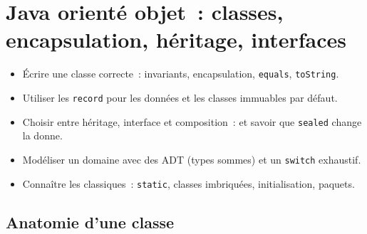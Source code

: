 \chapter{Java orient\'e objet~: classes, encapsulation, h\'eritage, interfaces}
\label{ch-java-oop}

\begin{objectif}
\begin{itemize}
  \item \'Ecrire une classe correcte~: invariants, encapsulation, \verb|equals|, \verb|toString|.
  \item Utiliser les \verb|record| pour les donn\'ees et les classes immuables par d\'efaut.
  \item Choisir entre h\'eritage, interface et composition~: et savoir que \verb|sealed| change la donne.
  \item Mod\'eliser un domaine avec des ADT (types sommes) et un \verb|switch| exhaustif.
  \item Conna\^itre les classiques~: \verb|static|, classes imbriqu\'ees, initialisation, paquets.
\end{itemize}
\end{objectif}

\section{Anatomie d'une classe}

